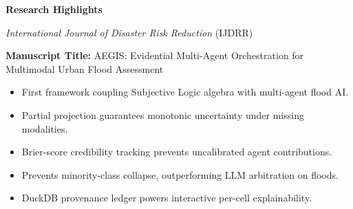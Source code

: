 \documentclass[11pt,a4paper]{article}
\begin{document}
\thispagestyle{empty}

\begin{center}
{\Large \bf Research Highlights \par}
\vspace{0.5em}
{\large \textit{International Journal of Disaster Risk Reduction} (IJDRR) \par}
\end{center}

\vspace{1.5em}

\noindent \textbf{Manuscript Title:} AEGIS: Evidential Multi-Agent Orchestration for Multimodal Urban Flood Assessment

\vspace{1.5em}

\begin{itemize}[leftmargin=*,itemsep=1em]
    \item First framework coupling Subjective Logic algebra with multi-agent flood AI.
    \item Partial projection guarantees monotonic uncertainty under missing modalities.
    \item Brier-score credibility tracking prevents uncalibrated agent contributions.
    \item Prevents minority-class collapse, outperforming LLM arbitration on floods.
    \item DuckDB provenance ledger powers interactive per-cell explainability.
\end{itemize}
\end{document}
